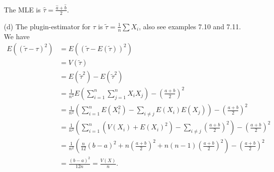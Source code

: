 \begin{itemize}
        The MLE is $\hat{\tau} = \frac{\hat{a} + \hat{b}}{2}$.
    \item[(d)] The plugin-estimator for $\tau$ is $\tilde{\tau} = \frac{1}{n} \sum X_i$, also see examples 7.10 and 7.11.
        We have
        \begin{equation*}
            \begin{split}
                E((\tilde{\tau} - \tau)^2)
                    &= E((\tilde{\tau} - E(\tilde{\tau}))^2) \\
                    &= V(\tilde{\tau}) \\
                    &= E(\tilde{\tau}^2) - E(\tilde{\tau}^2) \\
                    &= \frac{1}{n^2} E\left(\sum_{i = 1}^n \sum_{j = 1}^n X_i X_j\right) - \left(\frac{a + b}{2}\right)^2 \\
                    &= \frac{1}{n^2} \left(\sum_{i = 1}^n E(X_i^2) - \sum_{i \neq j} E(X_i) E(X_j)\right) - \left(\frac{a + b}{2}\right)^2 \\
                    &= \frac{1}{n^2} \left(\sum_{i = 1}^n (V(X_i) + E(X_i)^2) - \sum_{i \neq j} \left(\frac{a + b}{2}\right)^2\right) - \left(\frac{a + b}{2}\right)^2 \\
                    &= \frac{1}{n^2} \left(\frac{n}{12}(b - a)^2 + n\left(\frac{a + b}{2}\right)^2 + n(n - 1)\left(\frac{a + b}{2}\right)^2\right) - \left(\frac{a + b}{2}\right)^2 \\
                    &= \frac{(b - a)^2}{12 n}
                    = \frac{V(X)}{n}.
            \end{split}
        \end{equation*}
\end{itemize}

